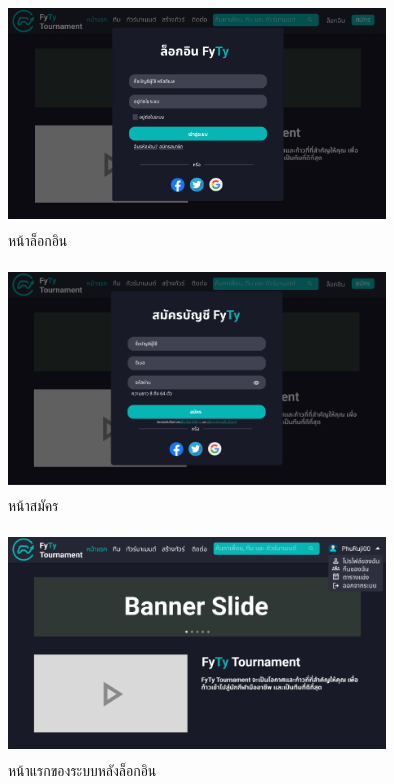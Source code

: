 \begin{figure}[h]
  \begin{center}
  \includegraphics[width=10cm,height=6cm,keepaspectratio]{login.png}
  \end{center}
  \caption[หน้าล็อกอิน]{หน้าล็อกอิน}
  \label{fig:หน้าล็อกอิน}
\end{figure}

\begin{figure}[h]
  \begin{center}
  \includegraphics[width=10cm,height=6cm,keepaspectratio]{reg.png}
  \end{center}
  \caption[หน้าสมัคร]{หน้าสมัคร}
  \label{fig:หน้าสมัคร}
\end{figure}

\begin{figure}[h]
  \begin{center}
  \includegraphics[width=10cm,height=6cm,keepaspectratio]{homeaf.png}
  \end{center}
  \caption[หน้าแรกของระบบหลังล็อกอิน]{หน้าแรกของระบบหลังล็อกอิน}
  \label{fig:หน้าแรกของระบบหลังล็อกอิน}
\end{figure}

